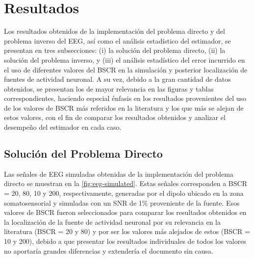 %
\chapter{Resultados}
\label{sec:results}

Los resultados obtenidos de la implementación del problema directo y del problema inverso del EEG, así como el análisis estadístico del estimador, se presentan en tres subsecciones: (i) la solución del problema directo, (ii) la solución del problema inverso, y (iii) el análisis estadístico del error incurrido en el uso de diferentes valores del BSCR en la simulación y posterior localización de fuentes de actividad neuronal.
A su vez, debido a la gran cantidad de datos obtenidos, se presentan los de mayor relevancia en las figuras y tablas correspondientes, haciendo especial énfasis en los resultados provenientes del uso de los valores de BSCR más referidos en la literatura y los que más se alejan de estos valores, con el fin de comparar los resultados obtenidos y analizar el desempeño del estimador en cada caso.

\section{Solución del Problema Directo}
\label{sec:results:direct}

Las señales de EEG simuladas obtenidas de la implementación del problema directo se muestran en la \cref{fig:eeg-simulated}. 
Estas señales corresponden a BSCR = 20, 80, 10 y 200, respectivamente, generadas por el dipolo ubicado en la zona somatosensorial y simuladas con un SNR de 1\% proveniente de la fuente.
Esos valores de BSCR fueron seleccionados para comparar los resultados obtenidos en la localización de la fuente de actividad neuronal por su relevancia en la literatura (BSCR = 20 y 80) y por ser los valores más alejados de estos (BSCR = 10 y 200), debido a que presentar los resultados individuales de todos los valores no aportaría grandes diferencias y extendería el documento sin causa.

